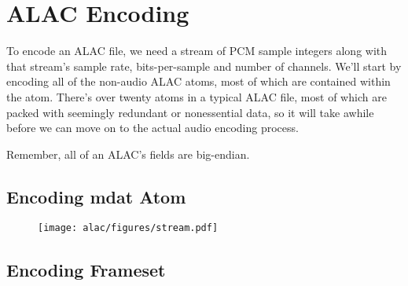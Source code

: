 
\section{ALAC Encoding}

To encode an ALAC file, we need a stream of PCM sample integers
along with that stream's sample rate, bits-per-sample and number of
channels.
We'll start by encoding all of the non-audio ALAC atoms,
most of which are contained within the  atom.
There's over twenty atoms in a typical ALAC file,
most of which are packed with seemingly redundant or
nonessential data,
so it will take awhile before we can move on to the actual
audio encoding process.

Remember, all of an ALAC's fields are big-endian.



\clearpage

\subsection{Encoding mdat Atom}
{
  
}
\begin{figure}[h]
\texttt{[image: alac/figures/stream.pdf]}
\end{figure}

\clearpage

\subsection{Encoding Frameset}
\label{alac:encode_frameset}
{
  
}


